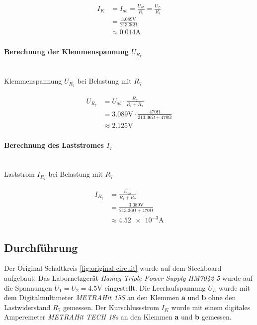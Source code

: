 \documentclass[a4paper, 11pt]{report}
\begin{document}
\begin{align}
\begin{split}
I_K &= I_{ab} = \frac{U_{ab}}{R_i} = \frac{U_{L}}{R_i}\\
&= \frac{3.089\si{\volt}}{213.36\si{\ohm}}\\
&\approx 0.014\si{\ampere}
\end{split}
\end{align}

\paragraph{Berechnung der Klemmenspannung $U_{R_7}$}\mbox{}\\
Klemmenspannung $U_{R_7}$ bei Belastung mit $R_7$

\begin{align}
\begin{split}
U_{R_7} &= U_{ab} \cdot \frac{R_7}{R_i + R_7}\\
&= 3.089\si{\volt} \cdot \frac{470\si{\ohm}}{213.36\si{\ohm} + 470\si{\ohm}}\\
&\approx 2.125\si{\volt}
\end{split}
\end{align}

\paragraph{Berechnung des Laststromes $I_7$}\mbox{}\\
Laststrom $I_{R_7}$ bei Belastung mit $R_7$

\begin{align}
\begin{split}
I_{R_7} &= \frac{U_{ab}}{R_i + R_7}\\
&= \frac{3.089\si{\volt}}{213.36\si{\ohm} + 470\si{\ohm}}\\
&\approx \num{4.52e-3}\si{\ampere}
\end{split}
\end{align}

\subsection{Durchführung}
Der Original-Schaltkreis \ref{fig:original-circuit} wurde auf dem Steckboard aufgebaut. Das Labornetzgerät \textit{Hameg Triple Power Supply HM7042-5} wurde auf die Spannungen \(U_1 = U_2 = 4.5\si{\volt}\) eingestellt. Die Leerlaufspannung \(U_L\) wurde mit dem Digitalmultimeter \textit{METRAHit 15S} an den Klemmen \textbf{a} und \textbf{b} ohne den Lastwiderstand \(R_7\) gemessen. Der Kurschlussstrom \(I_K\) wurde mit einem digitales Amperemeter \textit{METRAHit TECH 18s} an den Klemmen \textbf{a} und \textbf{b} gemessen.
\end{document}

